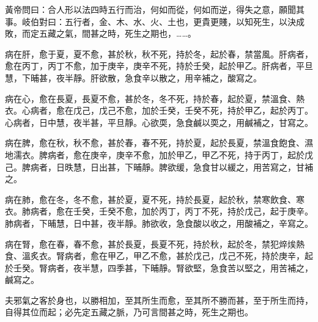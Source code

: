 \documentclass[12pt]{ctexbook}
\begin{document}
\begin{yuanwen}
黃帝問曰：合人形以法四時五行而治，何如而從，何如而逆，得失之意，願聞其事。岐伯對曰：五行者，金、木、水、火、土也，更貴更賤，以知死生，以決成敗，而定五藏之氣，間甚之時，死生之期也，……。

病在肝，愈于夏，夏不愈，甚於秋，秋不死，持於冬，起於春，禁當風。肝病者，愈在丙丁，丙丁不愈，加于庚辛，庚辛不死，持於壬癸，起於甲乙。肝病者，平旦慧，下晡甚，夜半靜。肝欲散，急食辛以散之，用辛補之，酸寫之。

病在心，愈在長夏，長夏不愈，甚於冬，冬不死，持於春，起於夏，禁溫食、熱衣。心病者，愈在戊己，戊己不愈，加於壬癸，壬癸不死，持於甲乙，起於丙丁。心病者，日中慧，夜半甚，平旦靜。心欲耎，急食鹹以耎之，用鹹補之，甘寫之。

病在脾，愈在秋，秋不愈，甚於春，春不死，持於夏，起於長夏，禁溫食飽食、濕地濡衣。脾病者，愈在庚辛，庚辛不愈，加於甲乙，甲乙不死，持于丙丁，起於戊己。脾病者，日昳慧，日出甚，下晡靜。脾欲缓，急食甘以緩之，用苦寫之，甘補之。

病在肺，愈在冬，冬不愈，甚於夏，夏不死，持於長夏，起於秋，禁寒飲食、寒衣。肺病者，愈在壬癸，壬癸不愈，加於丙丁，丙丁不死，持於戊己，起于庚辛。肺病者，下晡慧，日中甚，夜半靜。肺欲收，急食酸以收之，用酸補之，辛寫之。

病在腎，愈在春，春不愈，甚於長夏，長夏不死，持於秋，起於冬，禁犯焠㶼熱食、溫炙衣。腎病者，愈在甲乙，甲乙不愈，甚於戊己，戊己不死，持於庚辛，起於壬癸。腎病者，夜半慧，四季甚，下晡靜。腎欲堅，急食苦以堅之，用苦補之，鹹寫之。

夫邪氣之客於身也，以勝相加，至其所生而愈，至其所不勝而甚，至于所生而持，自得其位而起；必先定五藏之脈，乃可言間甚之時，死生之期也。
\end{yuanwen}

\end{document}
